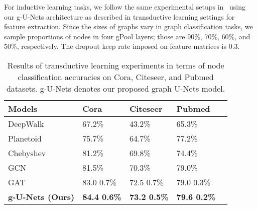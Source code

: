 \documentclass{article}
\begin{document}
For inductive learning tasks, we follow the same
experimental setups in~\cite{zhang2018end} using our g-U-Nets
architecture as described in transductive learning settings for feature
extraction. Since
the sizes of graphs vary in graph classification tasks, we sample
proportions of nodes in four gPool layers; those are 90\%, 70\%,
60\%, and 50\%, respectively. The dropout keep rate imposed on feature
matrices is 0.3.

\begin{table*}[t]
\centering \caption{Results of transductive learning experiments in
terms of node classification accuracies on Cora, Citeseer, and
Pubmed datasets. g-U-Nets denotes our proposed graph U-Nets model.}
\label{table:trans}
\begin{tabularx}{\textwidth}{  lx{3.5cm} YYY  }
    \hline
    \textbf{Models} & \textbf{Cora} & \textbf{Citeseer} & \textbf{Pubmed} \\ \hline\hline
    DeepWalk~\citep{perozzi2014deepwalk}            & 67.2\% & 43.2\%  & 65.3\%   \\ \hline
    Planetoid~\citep{yang2016revisiting}            & 75.7\% & 64.7\%  & 77.2\%   \\ \hline
    Chebyshev~\citep{defferrard2016convolutional}   & 81.2\% & 69.8\%  & 74.4\%   \\ \hline
    GCN~\citep{kipf2016semi}                        & 81.5\% & 70.3\%  & 79.0\%   \\ \hline
    GAT~\citep{velivckovic2017graph}                & 83.0  0.7\% & 72.5  0.7\% & 79.0  0.3\% \\ \hline
\textbf{g-U-Nets (Ours)}                         & \textbf{84.4  0.6\%}
                                                    & \textbf{73.2  0.5\%}
                                                    & \textbf{79.6  0.2\%} \\ \hline
    \hline
\end{tabularx}
\end{table*}
\end{document}
